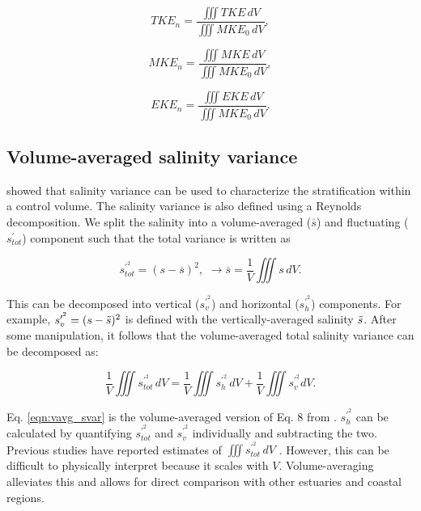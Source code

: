 \documentclass[draft]{agujournal2019}
\begin{document}
\begin{linenomath*}
    \begin{equation}
        TKE_n = \frac{\iiint TKE \, dV}{\iiint MKE_0 \, dV},
    \end{equation}
\end{linenomath*}
\begin{linenomath*}
    \begin{equation}
        MKE_n = \frac{\iiint M
        KE \, dV}{\iiint MKE_0 \, dV},
    \end{equation}
\end{linenomath*}
\begin{linenomath*}
    \begin{equation}
        EKE_n = \frac{\iiint EKE \, dV}{\iiint MKE_0 \, dV}.
    \end{equation}
\end{linenomath*}

\subsection{Volume-averaged salinity variance}
 showed that salinity variance can be used to characterize the stratification within a control volume. The salinity variance is also defined using a Reynolds decomposition. We split the salinity into a volume-averaged ($\overline{s}$) and fluctuating ($s_{tot}^\prime$) component such that the total variance is written as  
\begin{linenomath*}
    \begin{equation}
        s_{tot}^{\prime^2} = (s-\overline{s})^2, \, \, \xrightarrow{} \overline{s} = \frac{1}{V} \iiint s \, dV.  
    \end{equation}
\end{linenomath*}
This can be decomposed into vertical ($s_v^{\prime^2}$) and horizontal ($s_h^{\prime^2}$) components. For example, $s_v^{\prime^2} = (s-\Tilde{s})^2$ is defined with the vertically-averaged salinity $\Tilde{s}$. After some manipulation, it follows that the volume-averaged total salinity variance can be decomposed as:
\begin{linenomath*}
    \begin{equation} \label{eqn:vavg_svar}
        \frac{1}{V} \iiint s_{tot}^{\prime^2} \, dV = \frac{1}{V} \iiint s_{h}^{\prime^2} \, dV + \frac{1}{V} \iiint s_{v}^{\prime^2} dV. 
    \end{equation}
\end{linenomath*}
Eq. \ref{eqn:vavg_svar} is the volume-averaged version of Eq. 8 from . $s_h^{\prime^2}$ can be calculated by quantifying $s_{tot}^{\prime^2}$ and $s_{v}^{\prime^2}$ individually and subtracting the two. Previous studies have reported estimates of $\iiint s_{tot}^{\prime^2} \, dV$ \cite{Wang_2018, Burchard_2019}. However, this can be difficult to physically interpret because it scales with $V$. Volume-averaging alleviates this and allows for direct comparison with other estuaries and coastal regions.  
\end{document}
